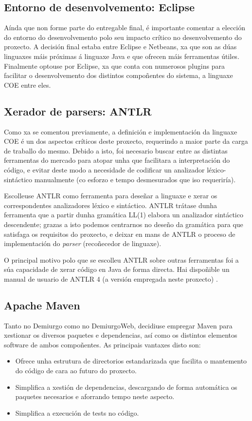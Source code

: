 \subsection{Entorno de desenvolvemento: Eclipse}
Aínda que non forme parte do entregable final, é importante comentar a elección
do entorno do desenvolvemento polo seu impacto crítico no desenvolvemento do
proxecto. A decisión final estaba entre Eclipse e Netbeans, xa que son as dúas
linguaxes máis próximas á linguaxe Java e que ofrecen máis ferramentas útiles.
Finalmente optouse por Eclipse, xa que conta con numerosos plugins para
facilitar o desenvolvemento dos distintos compoñentes do sistema, a linguaxe
COE entre eles.

\subsection{Xerador de parsers: ANTLR}
Como xa se comentou previamente, a definición e implementación da linguaxe COE é
un dos aspectos críticos deste proxecto, requerindo a maior parte da carga de
traballo do mesmo. Debido a isto, foi necesario buscar entre as distintas
ferramentas do mercado para atopar unha que facilitara a interpretación do
código, e evitar deste modo a necesidade de codificar un analizador
léxico-sintáctico manualmente (co esforzo e tempo desmesurados que iso
requeriría).
\par
Escolleuse ANTLR como ferramenta para deseñar a linguaxe e xerar os
correspondentes analizadores léxico e sintáctico. ANTLR trátase dunha ferramenta
que a partir dunha gramática LL(1) elabora un analizador sintáctico descendente;
grazas a isto podemos centrarnos no deseño da gramática para que satisfaga os
requisitos do proxecto, e deixar en mans de ANTLR o proceso de implementación
do \textit{parser} (recoñecedor de linguaxe).
\par
O principal motivo polo que se escolleu ANTLR sobre outras ferramentas foi a súa
capacidade de xerar código en Java de forma directa. Hai dispoñible un manual de
usuario de ANTLR 4 (a versión empregada neste proxecto) \cite{antlr}.

\subsection{Apache Maven}
Tanto no Demiurgo como no DemiurgoWeb, decidiuse empregar Maven para
xestionar os diversos paquetes e dependencias, así como os distintos elementos
software de ambos compoñentes.
As principais vantaxes disto son:
\begin{itemize}
  \item Ofrece unha estrutura de directorios estandarizada que facilita o
  mantemento do código de cara ao futuro do proxecto.
  \item Simplifica a xestión de dependencias, descargando de forma automática os
  paquetes necesarios e aforrando tempo neste aspecto.
  \item Simplifica a execución de tests no código.
\end{itemize}

